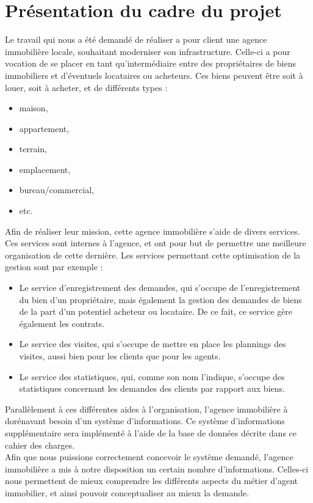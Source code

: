 \section{Présentation du cadre du projet}
Le travail qui nous a été demandé de réaliser a pour client une agence immobilière locale, souhaitant moderniser son infrastructure. Celle-ci a pour vocation de se placer en tant qu'intermédiaire entre des propriétaires de biens immobiliers et d'éventuels locataires ou acheteurs. Ces biens peuvent être soit à louer, soit à acheter, et de différents types : 
\begin{itemize}
	\item maison,
	\item appartement,
	\item terrain,
	\item emplacement,
	\item bureau/commercial,
	\item etc.\\
\end{itemize}

Afin de réaliser leur mission, cette agence immobilière s'aide de divers services. Ces services sont internes à l'agence, et ont pour but de permettre une meilleure organisation de cette dernière. Les services permettant cette optimisation de la gestion sont par exemple :
\begin{itemize}
\item Le service d'enregistrement des demandes, qui s'occupe de l'enregistrement du bien d'un propriétaire, mais également la gestion des demandes de biens de la part d'un potentiel acheteur ou locataire. De ce fait, ce service gère également les contrats.
\item Le service des visites, qui s'occupe de mettre en place les plannings des visites, aussi bien pour les clients que pour les agents.
\item Le service des statistiques, qui, comme son nom l'indique, s'occupe des statistiques concernant les demandes des clients par rapport aux biens. \\
\end{itemize}

Parallèlement à ces différentes aides à l'organisation, l'agence immobilière à dorénavant besoin d'un système d'informations. Ce système d'informations supplémentaire sera implémenté à l'aide de la base de données décrite dans ce cahier des charges.\\

Afin que nous puissions correctement concevoir le système demandé, l'agence immobilière a mis à notre disposition un certain nombre d'informations. Celles-ci nous permettent de mieux comprendre les différents aspects du métier d'agent immobilier, et ainsi pouvoir conceptualiser au mieux la demande. 